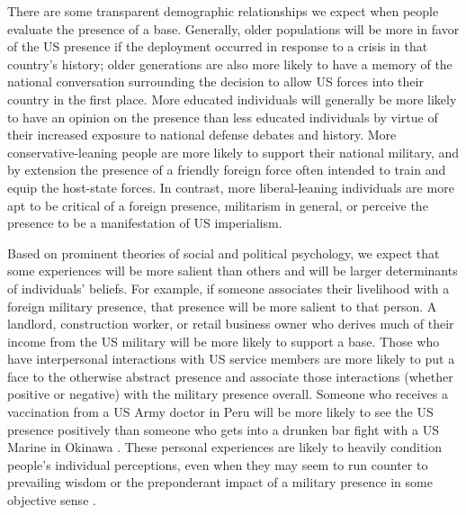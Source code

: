 {	There are some transparent demographic relationships we expect when people evaluate the presence of a base. Generally, older populations will be more in favor of the US presence if the deployment occurred in response to a crisis in that country's history; older generations are also more likely to have a memory of the national conversation surrounding the decision to allow US forces into their country in the first place. More educated individuals will generally be more likely to have an opinion on the presence than less educated individuals by virtue of their increased exposure to national defense debates and history. More conservative-leaning people are more likely to support their national military, and by extension the presence of a friendly foreign force often intended to train and equip the host-state forces. In contrast, more liberal-leaning individuals are more apt to be critical of a foreign presence, militarism in general, or perceive the presence to be a manifestation of US imperialism.
	
	Based on prominent theories of social and political psychology, we expect that some experiences will be more salient than others and will be larger determinants of individuals' beliefs. For example, if someone associates their livelihood with a foreign military presence, that presence will be more salient to that person. A landlord, construction worker, or retail business owner who derives much of their income from the US military will be more likely to support a base. Those who have interpersonal interactions with US service members are more likely to put a face to the otherwise abstract presence and associate those interactions (whether positive or negative) with the military presence overall\cite{Allen2020}. Someone who receives a vaccination from a US Army doctor in Peru will be more likely to see the US presence positively than someone who gets into a drunken bar fight with a US Marine in Okinawa \cite{Flynn2018}. These personal experiences are likely to heavily condition people's individual perceptions, even when they may seem to run counter to prevailing wisdom or the preponderant impact of a military presence in some objective sense \cite{Taber2006}.
	
	
}
